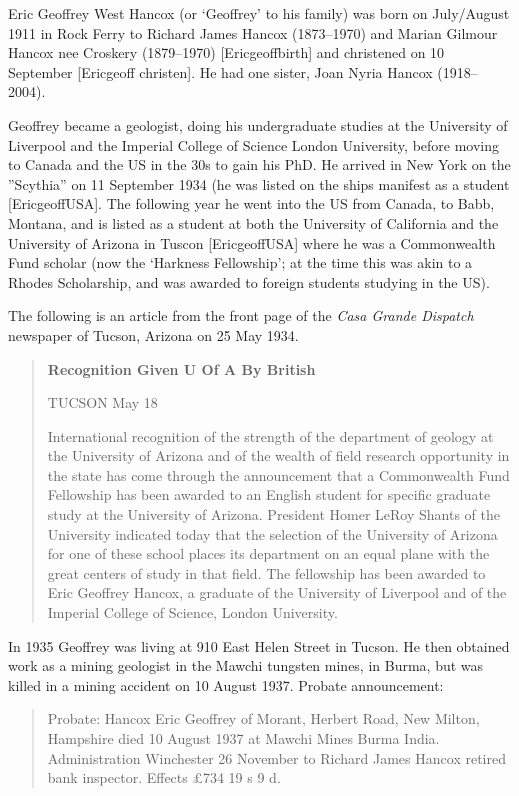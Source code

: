 
Eric Geoffrey West Hancox (or `Geoffrey' to his family) was  born on July/August 1911 in Rock Ferry to Richard James Hancox (1873--1970) and Marian Gilmour Hancox nee Croskery (1879--1970) [Ericgeoffbirth] and christened on 10 September [Ericgeoff christen].  He had one sister, Joan Nyria Hancox (1918--2004).  

Geoffrey became a geologist, doing his undergraduate studies at the University of Liverpool and the Imperial College of Science London University, before moving to Canada and the US in the 30s to gain his PhD. 
He arrived in New York on the ''Scythia'' on 11 September 1934 (he was listed on the ships manifest as a student [EricgeoffUSA]. The following year he went into the US from Canada, to Babb, Montana, and is listed as a student at both the University of California and the University of Arizona in Tuscon [EricgeoffUSA] where he was a Commonwealth Fund scholar (now the `Harkness Fellowship'; at the time this was akin to a Rhodes Scholarship, and was awarded to foreign students studying in the US).

The following is an article from the front page of the \emph{Casa Grande Dispatch} newspaper of Tucson, Arizona on 25 May 1934.\cite{CasaP1}

\begin{quotation}
\textbf{Recognition Given U Of A By British}

TUCSON May 18

International recognition of the strength of the department of geology at the University of Arizona and of the wealth of field research opportunity in the state has come through the announcement that a Commonwealth Fund Fellowship has been awarded to an English student for specific graduate study at the University of Arizona. President Homer LeRoy Shants of the University indicated today that the selection of the University of Arizona for one of these school places its department on an equal plane with the great centers of study in that field. The fellowship has been awarded to Eric Geoffrey Hancox, a graduate of the University of Liverpool and of the Imperial College of Science, London University.
\end{quotation}

In 1935 Geoffrey was living at 910 East Helen Street in Tucson.\cite{USCities}
He then obtained work as a mining geologist in  the Mawchi tungsten mines, in Burma, but was killed in a mining accident on 10 August 1937.
Probate announcement:\cite{EGWHprobate}
\begin{quotation}
Probate: Hancox Eric Geoffrey of Morant, Herbert Road, New Milton, Hampshire died 10 August 1937 at Mawchi Mines Burma India. Administration Winchester 26 November to Richard James Hancox retired bank inspector. Effects \pounds734 19 s 9 d.
\end{quotation}
